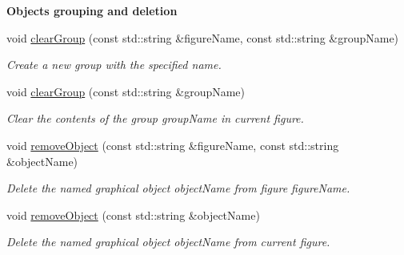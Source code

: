 \begin{Indent}\textbf{ Objects grouping and deletion}\par
\begin{DoxyCompactItemize}
\item 
void \hyperlink{group__drawing_gaf31a1d5f2b5e2b24638e8d5f98298cc9}{clear\+Group} (const std\+::string \&figure\+Name, const std\+::string \&group\+Name)
\begin{DoxyCompactList}\small\item\em Create a new group with the specified {\itshape name}. \end{DoxyCompactList}\item 
void \hyperlink{group__drawing_ga04b794cb10a281c580ce457a545ddf1e}{clear\+Group} (const std\+::string \&group\+Name)
\begin{DoxyCompactList}\small\item\em Clear the contents of the group {\itshape group\+Name} in current figure. \end{DoxyCompactList}\item 
void \hyperlink{group__drawing_ga97214bfe53545e8ba3fea1bf27433bf8}{remove\+Object} (const std\+::string \&figure\+Name, const std\+::string \&object\+Name)
\begin{DoxyCompactList}\small\item\em Delete the named graphical object {\itshape object\+Name} from figure {\itshape figure\+Name}. \end{DoxyCompactList}\item 
void \hyperlink{group__drawing_ga0fc887c8bab5eb1c9a3e5e315e9d44d5}{remove\+Object} (const std\+::string \&object\+Name)
\begin{DoxyCompactList}\small\item\em Delete the named graphical object {\itshape object\+Name} from current figure. \end{DoxyCompactList}\end{DoxyCompactItemize}
\end{Indent}
